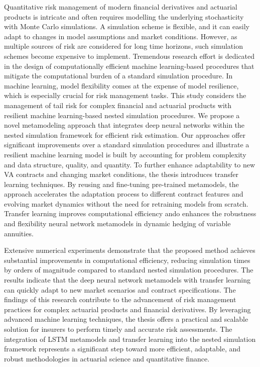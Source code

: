 Quantitative risk management of modern financial derivatives and actuarial products is intricate and often requires modelling the underlying stochasticity with Monte Carlo simulations.
A simulation scheme is flexible, and it can easily adapt to changes in model assumptions and market conditions.
However, as multiple sources of risk are considered for long time horizons, such simulation schemes become expensive to implement. 
Tremendous research effort is dedicated in the design of computationally efficient machine learning-based procedures that mitigate the computational burden of a standard simulation procedure.
In machine learning, model flexibility comes at the expense of model resilience, which is especially crucial for risk management tasks.
This study considers the management of tail risk for complex financial and actuarial products with resilient machine learning-based nested simulation procedures.
We propose a novel metamodeling approach that integrates deep neural networks within the nested simulation framework for efficient risk estimation.
Our approaches offer significant improvements over a standard simulation procedures and illustrate a resilient machine learning model is built by accounting for problem complexity and data structure, quality, and quantity.
To further enhance adaptability to new VA contracts and changing market conditions, the thesis introduces transfer learning techniques. 
By reusing and fine-tuning pre-trained metamodels, the approach accelerates the adaptation process to different contract features and evolving market dynamics without the need for retraining models from scratch. 
Transfer learning improves computational efficiency ando enhances the robustness and flexibility neural network metamodels in dynamic hedging of variable annuities.

Extensive numerical experiments demonstrate that the proposed method achieves substantial improvements in computational efficiency, reducing simulation times by orders of magnitude compared to standard nested simulation procedures.
The results indicate that the deep neural network metamodels with transfer learning can quickly adapt to new market scenarios and contract specifications.
The findings of this research contribute to the advancement of risk management practices for complex actuarial products and financial derivatives.
By leveraging advanced machine learning techniques, the thesis offers a practical and scalable solution for insurers to perform timely and accurate risk assessments.
The integration of LSTM metamodels and transfer learning into the nested simulation framework represents a significant step toward more efficient, adaptable, and robust methodologies in actuarial science and quantitative finance.


